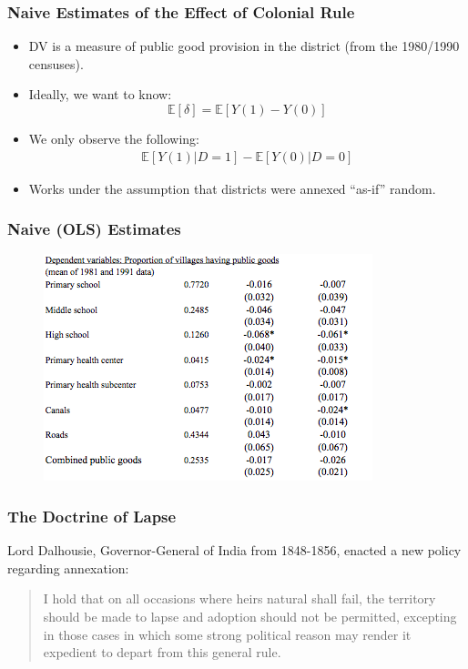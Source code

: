 \documentclass{beamer}
\begin{document}
\begin{frame}
  \frametitle{Naive Estimates of the Effect of Colonial Rule}
  \begin{itemize}
  \item DV is a measure of public good provision in the district (from
    the 1980/1990 censuses).
  \item Ideally, we want to know:
$$\mathbb{E}[\delta] =
\mathbb{E}[Y(1)-Y(0)]$$
\item We only observe the following:
\begin{eqnarray*}
\mathbb{E}[Y(1)|D=1] - \mathbb{E}[Y(0)|D=0]
\end{eqnarray*}
\item Works under the assumption that districts were annexed ``as-if''
  random.
 \end{itemize}
\end{frame}

 \begin{frame}
   \frametitle{Naive (OLS) Estimates}
 \begin{figure}[t]
    \centering
      \includegraphics[scale=.8]{naive.png}
 \end{figure}
 \end{frame}

 \begin{frame}
   \frametitle{The Doctrine of Lapse}
   Lord Dalhousie, Governor-General of India from 1848-1856, enacted a
   new policy regarding annexation:
   \begin{quote}
     I hold that on all occasions where heirs natural shall fail, the territory should be made to lapse and adoption should not be permitted, excepting in those cases in which some strong political reason may render it expedient to depart from this general rule.
   \end{quote}
   \end{frame}
\end{document}
